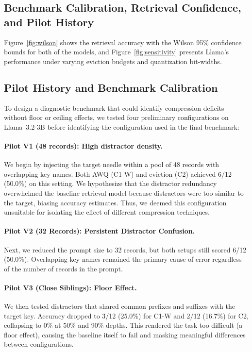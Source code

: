 \documentclass[sigconf,nonacm]{acmart}
\begin{document}
\begin{itemize}
\section{Benchmark Calibration, Retrieval Confidence, and Pilot History}
\label{app:benchmark-pilots}

Figure~\ref{fig:wilson} shows the retrieval accuracy with the Wilson 95\% confidence bounds for both of the models, and Figure~\ref{fig:sensitivity} presents Llama's performance under varying eviction budgets and quantization bit-widths.

\subsection{Pilot History and Benchmark Calibration}

To design a diagnostic benchmark that could identify compression deficits without floor or ceiling effects, we tested four preliminary configurations on Llama~3.2-3B before identifying the configuration used in the final benchmark:



\paragraph{Pilot V1 (48 records): High distractor density.}

We begin by injecting the target needle within a pool of 48 records with overlapping key names. Both AWQ (C1-W) and eviction (C2) achieved 6/12 (50.0\%) on this setting. We hypothesize that the distractor redundancy overwhelmed the baseline retrieval model because distractors were too similar to the target, biasing accuracy estimates. Thus, we deemed this configuration unsuitable for isolating the effect of different compression techniques.

\paragraph{Pilot V2 (32 Records): Persistent Distractor Confusion.}
Next, we reduced the prompt size to 32 records, but both setups still scored 6/12 (50.0\%). Overlapping key names remained the primary cause of error regardless of the number of records in the prompt.

\paragraph{Pilot V3 (Close Siblings): Floor Effect.}
We then tested distractors that shared common prefixes and suffixes with the target key. Accuracy dropped to 3/12 (25.0\%) for C1-W and 2/12 (16.7\%) for C2, collapsing to 0\% at 50\% and 90\% depths. This rendered the task too difficult (a floor effect), causing the baseline itself to fail and masking meaningful differences between configurations.


\end{itemize}
\end{document}
